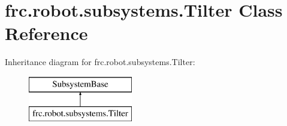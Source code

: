 \hypertarget{classfrc_1_1robot_1_1subsystems_1_1_tilter}{}\section{frc.\+robot.\+subsystems.\+Tilter Class Reference}
\label{classfrc_1_1robot_1_1subsystems_1_1_tilter}
Inheritance diagram for frc.\+robot.\+subsystems.\+Tilter\+:\begin{figure}[H]
\begin{center}
\leavevmode
\includegraphics[height=2.000000cm]{classfrc_1_1robot_1_1subsystems_1_1_tilter}
\end{center}
\end{figure}
